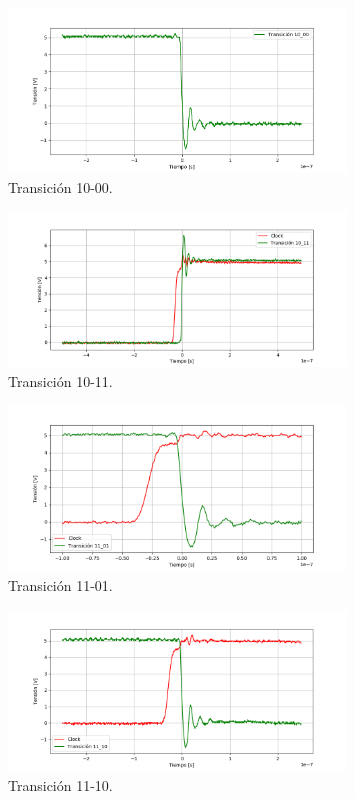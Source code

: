 \begin{figure}[H]
	\centering
	\includegraphics[width=0.8\textwidth]{ImagenesEjercicio1/10-00.PNG}
	\caption{Transición 10-00.}
	\label{fig:1000}
\end{figure}
\begin{figure}[H]
	\centering
	\includegraphics[width=0.8\textwidth]{ImagenesEjercicio1/10-11.PNG}
	\caption{Transición 10-11.}
	\label{fig:1011}
\end{figure}
\begin{figure}[H]
	\centering
	\includegraphics[width=0.8\textwidth]{ImagenesEjercicio1/11-01.PNG}
	\caption{Transición 11-01.}
	\label{fig:1101}
\end{figure}
\begin{figure}[H]
	\centering
	\includegraphics[width=0.8\textwidth]{ImagenesEjercicio1/11-10.PNG}
	\caption{Transición 11-10.}
	\label{fig:1110}
\end{figure}
